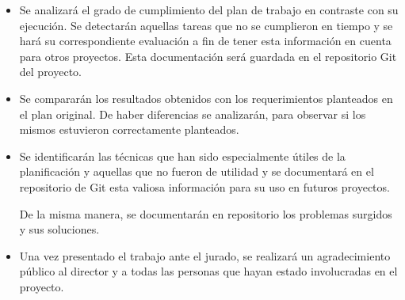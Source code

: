 \documentclass[11pt]{charter}
\begin{document}
\begin{itemize}
\item Se analizará el grado de cumplimiento del plan de trabajo en contraste con su ejecución. Se detectarán aquellas tareas que no se cumplieron en tiempo y se hará su correspondiente evaluación a fin de tener esta información en cuenta para otros proyectos. Esta documentación será guardada en el repositorio Git del proyecto.

\item Se compararán los resultados obtenidos con los requerimientos planteados en el plan original. De haber diferencias se analizarán, para observar si los mismos estuvieron correctamente planteados.


\item Se identificarán las técnicas que han sido especialmente útiles de la planificación y aquellas que no fueron de utilidad y se documentará en el repositorio de Git esta valiosa información para su uso en futuros proyectos.

De la misma manera, se documentarán en repositorio los problemas surgidos y sus soluciones.

\item Una vez presentado el trabajo ante el jurado, se realizará un agradecimiento público al
director y a todas las personas que hayan estado involucradas en el proyecto.

\end{itemize}
\end{document}
